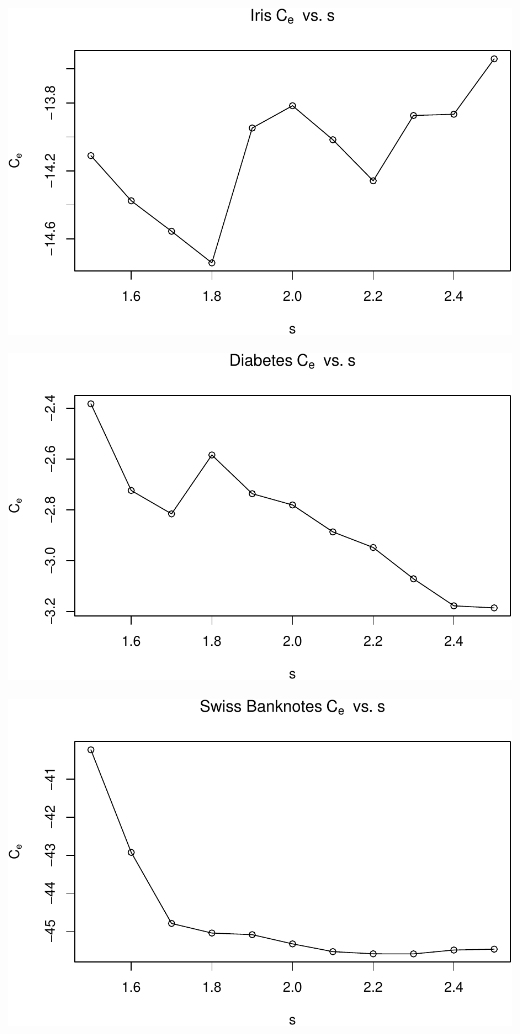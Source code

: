 \begin{center}\includegraphics[width=1\linewidth]{Report_files/figure-latex/unnamed-chunk-24-2} \end{center}

\begin{center}\includegraphics[width=1\linewidth]{Report_files/figure-latex/unnamed-chunk-24-3} \end{center}

\begin{center}\includegraphics[width=1\linewidth]{Report_files/figure-latex/unnamed-chunk-24-4} \end{center}

